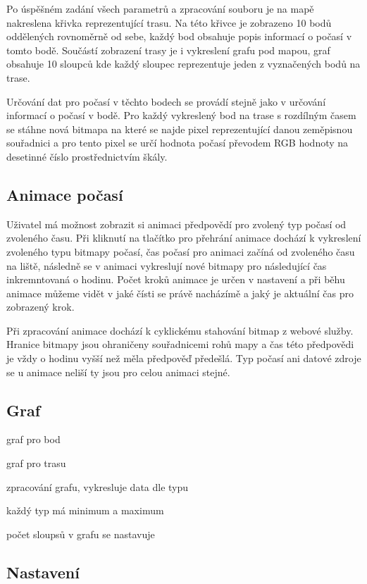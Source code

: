 \documentclass[czech,bachelor,dept460,male,csharp,cpdeclaration]{diploma}
\begin{document}
	Po úspěšném zadání všech parametrů a zpracování souboru je na mapě nakreslena křivka reprezentující trasu. Na této křivce je zobrazeno 10 bodů oddělených rovnoměrně od sebe, každý bod obsahuje popis informací o počasí v tomto bodě. Součástí zobrazení trasy je i vykreslení grafu pod mapou, graf obsahuje 10 sloupců kde každý sloupec reprezentuje jeden z vyznačených bodů na trase. 
	
	Určování dat pro počasí v těchto bodech se provádí stejně jako v určování informací o počasí v bodě. Pro každý vykreslený bod na trase s rozdílným časem se stáhne nová bitmapa na které se najde pixel reprezentující danou zeměpisnou souřadnici a pro tento pixel se určí hodnota počasí převodem RGB hodnoty na desetinné číslo prostřednictvím škály.
	
	\subsection{Animace počasí}
	
	Uživatel má možnost zobrazit si animaci předpovědí pro zvolený typ počasí od zvoleného času. Při kliknutí na tlačítko pro přehrání animace dochází k vykreslení zvoleného typu bitmapy počasí, čas počasí pro animaci začíná od zvoleného času na liště, následně se v animaci vykreslují nové bitmapy pro následující čas inkremntovaná o hodinu. Počet kroků animace je určen v nastavení a při běhu animace můžeme vidět v jaké čísti se právě nacházímě a jaký je aktuální čas pro zobrazený krok.
	
	Při zpracování animace dochází k cyklickému stahování bitmap z webové služby. Hranice bitmapy jsou ohraničeny souřadnicemi rohů mapy a čas této předpovědi je vždy o hodinu vyšší než měla předpověď předešlá. Typ počasí ani datové zdroje se u animace neliší ty jsou pro celou animaci stejné.
	
	\subsection{Graf}
	
	graf pro bod
	
	graf pro trasu
	
	zpracování grafu, vykresluje data dle typu
	
	každý typ má minimum a maximum
	
	počet sloupsů v grafu se nastavuje
	
	\subsection{Nastavení}
	
\end{document}
